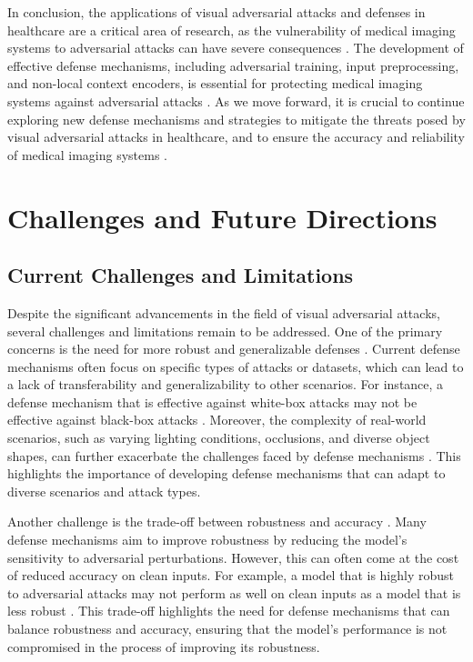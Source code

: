 \documentclass[11pt]{article}
\begin{document}
In conclusion, the applications of visual adversarial attacks and defenses in healthcare are a critical area of research, as the vulnerability of medical imaging systems to adversarial attacks can have severe consequences \cite{ref121}. The development of effective defense mechanisms, including adversarial training, input preprocessing, and non-local context encoders, is essential for protecting medical imaging systems against adversarial attacks \cite{ref122}. As we move forward, it is crucial to continue exploring new defense mechanisms and strategies to mitigate the threats posed by visual adversarial attacks in healthcare, and to ensure the accuracy and reliability of medical imaging systems \cite{ref17}.

\section{Challenges and Future Directions}

\subsection{Current Challenges and Limitations}

Despite the significant advancements in the field of visual adversarial attacks, several challenges and limitations remain to be addressed. One of the primary concerns is the need for more robust and generalizable defenses \cite{ref8}. Current defense mechanisms often focus on specific types of attacks or datasets, which can lead to a lack of transferability and generalizability to other scenarios. For instance, a defense mechanism that is effective against white-box attacks may not be effective against black-box attacks \cite{ref128}. Moreover, the complexity of real-world scenarios, such as varying lighting conditions, occlusions, and diverse object shapes, can further exacerbate the challenges faced by defense mechanisms \cite{ref3}. This highlights the importance of developing defense mechanisms that can adapt to diverse scenarios and attack types.

Another challenge is the trade-off between robustness and accuracy \cite{ref129}. Many defense mechanisms aim to improve robustness by reducing the model's sensitivity to adversarial perturbations. However, this can often come at the cost of reduced accuracy on clean inputs. For example, a model that is highly robust to adversarial attacks may not perform as well on clean inputs as a model that is less robust \cite{ref14}. This trade-off highlights the need for defense mechanisms that can balance robustness and accuracy, ensuring that the model's performance is not compromised in the process of improving its robustness.
\end{document}
